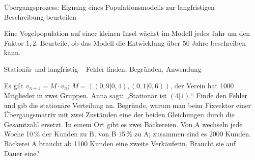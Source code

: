 \begin{aufgabe}{Übergangsprozess: Eignung eines Populationsmodells zur langfristigen Beschreibung beurteilen}
\begin{teile}
\teil Eine Vogelpopulation auf einer kleinen Insel wächst im Modell jedes Jahr um den Faktor $1{,}2$. Beurteile, ob das Modell die Entwicklung über 50 Jahre beschreiben kann.
\end{teile}
\end{aufgabe}

\begin{aufgabe}{Stationär und langfristig – Fehler finden, Begründen, Anwendung}
\begin{teile}
\teil Es gilt $v_{n+1} = M \cdot v_n$; $M = ((0{,}9 | 0{,}4), (0{,}1 | 0{,}6))$, der Verein hat 1000 Mitglieder in zwei Gruppen. Anna sagt: „Stationär ist $(4 | 1)$.“ Finde den Fehler und gib die stationäre Verteilung an.
\teil Begründe, warum man beim Fixvektor einer Übergangsmatrix mit zwei Zuständen eine der beiden Gleichungen durch die Gesamtzahl ersetzt.
\teil In einem Ort gibt es zwei Bäckereien. Von A wechseln jede Woche 10\,\% der Kunden zu B, von B 15\,\% zu A; zusammen sind es 2000 Kunden. Bäckerei A braucht ab 1100 Kunden eine zweite Verkäuferin. Braucht sie auf Dauer eine?
\end{teile}
\end{aufgabe}
